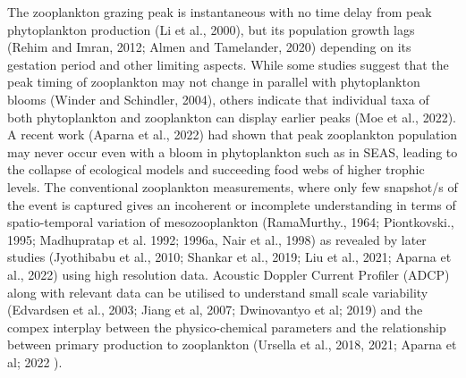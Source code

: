 \documentclass{article}
\begin{document}
	The zooplankton grazing peak is instantaneous with no time delay from peak phytoplankton production (Li et al., 2000), but its population growth lags (Rehim and Imran, 2012; Almen and Tamelander, 2020) depending on its gestation period and other limiting aspects. While some studies suggest that the peak timing of zooplankton may not change in parallel with phytoplankton blooms (Winder and Schindler, 2004), others indicate that individual taxa of both phytoplankton and zooplankton can display earlier peaks (Moe et al., 2022). A recent work (Aparna et al., 2022) had shown that peak zooplankton population may never occur even with a bloom in phytoplankton such as in SEAS, leading to the collapse of ecological models and succeeding food webs of higher trophic levels.  
	The conventional zooplankton measurements, where only few snapshot/s of the event is captured gives an incoherent or incomplete understanding in terms of spatio-temporal variation of mesozooplankton (RamaMurthy., 1964; Piontkovski., 1995; Madhupratap et al. 1992; 1996a, Nair et al., 1998) as revealed by later studies (Jyothibabu et al., 2010; Shankar et al., 2019; Liu et al., 2021; Aparna et al., 2022) using high resolution data.  Acoustic Doppler Current Profiler (ADCP) along with relevant data can be utilised to understand small scale variability (Edvardsen et al., 2003; Jiang et al, 2007; Dwinovantyo et al; 2019) and the compex interplay between the physico-chemical parameters and the relationship between primary production to zooplankton (Ursella et al., 2018, 2021; Aparna et al; 2022 ).
	

	
\end{document}

